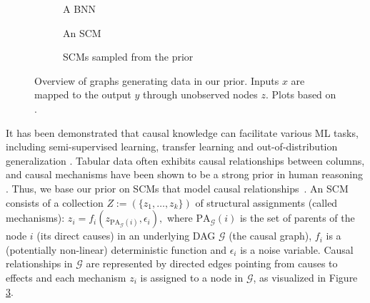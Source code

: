 \documentclass{article}
\begin{document}
\label{sec:causal prior}
%
%
\begin{figure}[t]
     \centering
     \begin{subfigure}[b]{0.3\textwidth}
         \centering
         
         \caption{A BNN\label{fig:bnn}}
     \end{subfigure}
     \hfill
     \begin{subfigure}[b]{0.3\textwidth}
         \centering
         
         \caption{An SCM\label{fig:scm}}
     \end{subfigure}
     \hfill
     \begin{subfigure}[b]{0.3\textwidth}
         \centering
         
         \caption{SCMs sampled from the prior}
     \end{subfigure}
        \caption{Overview of graphs generating data in our prior. Inputs $x$ are mapped to the output $y$ through unobserved nodes $z$. Plots based on \cite{muller-iclr22a}.}
        \label{fig:structural_graphs}
\end{figure}
%
It has been demonstrated that causal knowledge can facilitate various ML tasks, including semi-supervised learning, transfer learning and out-of-distribution generalization \citep{scholkopf2012causal, NEURIPS2019_2172fde4, rotenh2018}.
Tabular data often exhibits causal relationships between columns, and causal mechanisms have been shown to be a strong prior in human reasoning \citep{waldmann2013causal, explanatoryvalues}.
Thus, we base our \methodname{} prior on SCMs that model causal relationships~\citep{pearl_2009, causalinferencelearningbook}.
An SCM %
consists of a collection $Z := (\{z_1, \dots, z_k\})$ of structural assignments (called mechanisms): $z_i = f_i(z_{\text{PA}_{\mathcal{G}}(i)}, \epsilon_i), \label{scm_eq}$
where $\text{PA}_{\mathcal{G}}(i)$ is the set of parents of the node $i$ (its direct causes) in an underlying DAG $\mathcal{G}$ (the causal graph), $f_i$ is a (potentially non-linear) deterministic function and $\epsilon_i$ is a noise variable.
Causal relationships in $\mathcal{G}$ are represented by directed edges pointing from causes to effects and each mechanism $z_i$ is assigned to a node in $\mathcal{G}$, as visualized in Figure \ref{fig:structural_graphs}.
\end{document}
